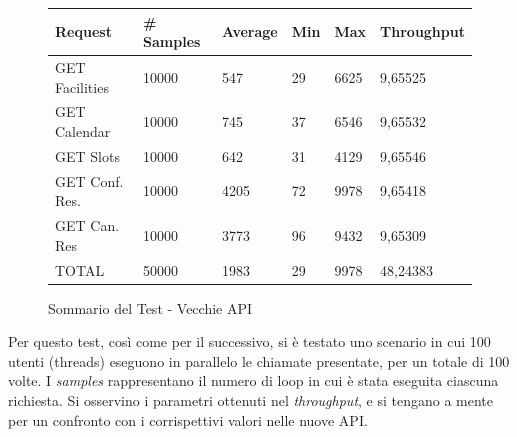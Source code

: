 \begin{figure}[H]
    \begin{table}[H]
        \centering
        \begin{tabular}{ |p{3cm}||p{2cm}|p{2cm}|p{1cm}|p{1cm}|p{2cm}| }
            \hline
            Request & \# Samples & Average  & Min & Max &  Throughput\\
            \hline
            GET Facilities      & 10000    & 547   & 29 & 6625 & 9,65525      \\
            GET Calendar        & 10000    & 745   & 37 & 6546        & 9,65532      \\
            GET Slots        & 10000    & 642   & 31 & 4129        & 9,65546      \\
            GET Conf. Res.        & 10000    & 4205    & 72 & 9978        & 9,65418      \\
            GET Can. Res        & 10000    & 3773    & 96 & 9432        & 9,65309      \\
            TOTAL        & 50000    & 1983    & 29 & 9978        & 48,24383      \\
            \hline
        \end{tabular}
    \end{table}
    \caption{Sommario del Test - Vecchie API}
    \label{fig:oldapi100t_summary}
\end{figure}
Per questo test, così come per il successivo, si è testato uno scenario in cui 100 utenti (threads) eseguono in parallelo le chiamate presentate, per un totale di 100 volte. I \emph{samples} rappresentano il numero di loop in cui è stata eseguita ciascuna richiesta. Si osservino i parametri ottenuti nel \emph{throughput}, e si tengano a mente per un confronto con i corrispettivi valori nelle nuove API.

